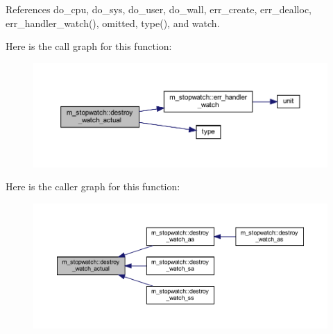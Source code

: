 References do\+\_\+cpu, do\+\_\+sys, do\+\_\+user, do\+\_\+wall, err\+\_\+create, err\+\_\+dealloc, err\+\_\+handler\+\_\+watch(), omitted, type(), and watch.

Here is the call graph for this function\+:
\nopagebreak
\begin{figure}[H]
\begin{center}
\leavevmode
\includegraphics[width=350pt]{namespacem__stopwatch_a04d101b90fcf3f9678604f95f9768a63_cgraph}
\end{center}
\end{figure}
Here is the caller graph for this function\+:
\nopagebreak
\begin{figure}[H]
\begin{center}
\leavevmode
\includegraphics[width=350pt]{namespacem__stopwatch_a04d101b90fcf3f9678604f95f9768a63_icgraph}
\end{center}
\end{figure}
\mbox{\label{namespacem__stopwatch_a96a4051d4baf7bd447bc16c0b47983d4}} 

